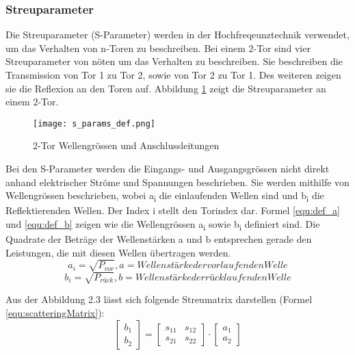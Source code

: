 \subsubsection{Streuparameter}\label{subsubsec:streuparameter}

Die Streuparameter (S-Parameter) werden in der Hochfreqeunztechnik verwendet, um das Verhalten von n-Toren zu beschreiben. Bei einem 2-Tor sind vier Streuparameter von nöten um das Verhalten zu beschreiben. Sie beschreiben die Transmission von Tor 1 zu Tor 2, sowie von Tor 2 zu Tor 1. Des weiteren zeigen sie die Reflexion an den Toren auf. Abbildung \ref{fig:2-Tor}  zeigt die Streuparameter an einem 2-Tor. 
\begin{figure}[H]
	\centering
	\texttt{[image: s\_params\_def.png]}
	\caption{2-Tor Wellengrössen und Anschlussleitungen \cite{hftech}}
	\label{fig:2-Tor}
\end{figure}
Bei den S-Parameter werden die Eingangs- und Ausgangsgrössen nicht direkt anhand elektrischer Ströme und Spannungen beschrieben. Sie werden mithilfe von Wellengrössen beschrieben, wobei a\textsubscript{i} die einlaufenden Wellen sind und b\textsubscript{i} die Reflektierenden Wellen. Der Index i stellt den Torindex dar. Formel \ref{equ:def_a} und \ref{equ:def_b} zeigen wie die Wellengrössen a\textsubscript{i} sowie b\textsubscript{i} definiert sind. Die Quadrate der Beträge der Wellenstärken a und b entsprechen gerade den Leistungen, die mit diesen Wellen übertragen werden.\cite{hftech}\cite{Bernstein2015}
\begin{equation}\label{equ:def_a}
	a_{ i } = \sqrt{ P_{ vor } }, a = Wellenstärke der vorlaufenden Welle
\end{equation}
\begin{equation}\label{equ:def_b}
	b_{ i } = \sqrt{ P_{ rück } }, b = Wellenstärke der rücklaufenden Welle
\end{equation}

Aus der Abbildung 2.3 lässt sich folgende Streumatrix darstellen (Formel \ref{equ:scatteringMatrix}):
\begin{equation}\label{equ:scatteringMatrix}
	\left[
		\begin{matrix}b_1 \\ b_2 \end{matrix}
	\right]
 	=
 	\left[
 		\begin{matrix}
			s_{11}&s_{12} \\s_{21}&s_{22}
		\end{matrix}
	\right]
	\cdot 
	\left[
		\begin{matrix}
			a_1\\a_2
		\end{matrix}
	\right]
\end{equation}

